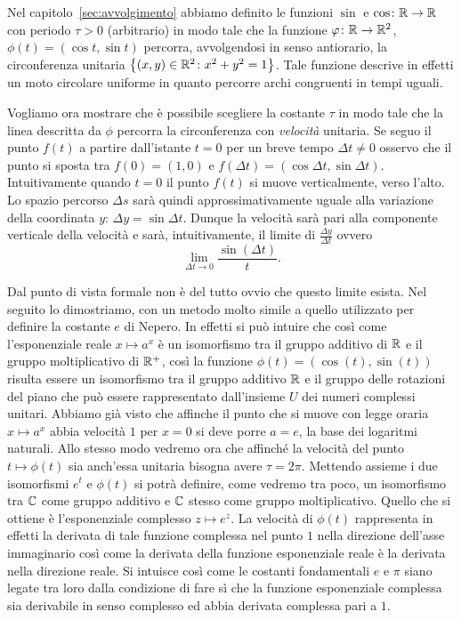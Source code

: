 Nel capitolo~\ref{sec:avvolgimento} abbiamo definito le 
funzioni $\sin$ e $\cos\colon {\mathbb R}\to {\mathbb R}$ con periodo $\tau>0$ (arbitrario)
in modo tale che la funzione $\varphi\colon {\mathbb R}\to{\mathbb R}^2$, $\phi(t)=(\cos t, \sin t)$ 
percorra, avvolgendosi in senso antiorario, la circonferenza 
unitaria ${\left\{ (x,y)\in {\mathbb R}^2\colon x^2+y^2=1 \right\}}$.
Tale funzione descrive in effetti un moto circolare uniforme 
in quanto percorre archi congruenti in tempi uguali.

Vogliamo ora mostrare che è possibile scegliere la costante $\tau$
in modo tale che la linea descritta da $\phi$ percorra la circonferenza 
con \emph{velocità} unitaria.
%
Se seguo il punto $f(t)$ a partire dall'istante $t=0$ per un breve tempo 
$\Delta t\neq 0$
osservo che il punto si sposta tra $f(0) = (1,0)$ e 
$f(\Delta t) = (\cos \Delta t, \sin \Delta t)$.
%
Intuitivamente quando $t=0$ il punto $f(t)$ si muove verticalmente, 
verso l'alto. 
Lo spazio percorso $\Delta s$ sarà quindi approssimativamente 
uguale alla variazione della coordinata $y$: 
$\Delta y = \sin \Delta t$.
Dunque la velocità sarà pari alla componente verticale della velocità 
e sarà, intuitivamente, il limite di $\frac{\Delta y}{\Delta t}$ ovvero 
\[
\lim_{\Delta t\to 0} \frac{\sin(\Delta t)}{t}.  
\]

Dal punto di vista formale non è del tutto ovvio che questo limite esista.
Nel seguito lo dimostriamo, con un metodo molto simile a quello utilizzato 
per definire la costante $e$ di Nepero.
In effetti si può intuire che così come l'esponenziale reale $x\mapsto a^x$ 
è un isomorfismo tra il gruppo additivo di ${\mathbb R}$ e il gruppo moltiplicativo 
di ${\mathbb R}^+$, così la funzione $\phi(t) = (\cos(t), \sin(t))$ 
risulta essere un isomorfismo 
tra il gruppo additivo ${\mathbb R}$ e il gruppo delle rotazioni del piano che può essere 
rappresentato dall'insieme $U$ dei numeri complessi unitari.
Abbiamo già visto che affinche il punto che si muove con legge 
oraria $x\mapsto a^x$ abbia velocità $1$ per $x=0$ 
si deve porre $a=e$, la base dei logaritmi naturali.
Allo stesso modo vedremo ora che affinché la velocità 
del punto $t\mapsto \phi(t)$ 
sia anch'essa unitaria bisogna avere $\tau = 2\pi$.
Mettendo assieme i due isomorfismi $e^t$ e $\phi(t)$ si potrà definire,
come vedremo tra poco, un isomorfismo tra ${\mathbb C}$ come gruppo additivo e 
${\mathbb C}$ stesso come gruppo moltiplicativo.
Quello che si ottiene è l'esponenziale complesso $z\mapsto e^z$. 
La velocità di $\phi(t)$ rappresenta in effetti la derivata di tale funzione 
complessa nel punto $1$ nella direzione dell'asse immaginario 
così come la derivata della funzione esponenziale reale è la derivata 
nella direzione reale. 
Si intuisce così come le costanti fondamentali $e$ e $\pi$ siano legate 
tra loro dalla condizione di fare sì che la funzione esponenziale complessa 
sia derivabile in senso complesso ed abbia derivata complessa pari a $1$.

